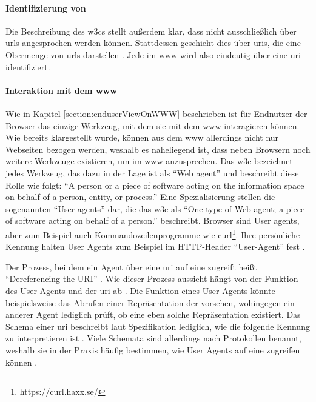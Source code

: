             \paragraph*{Identifizierung von \resources}
            Die Beschreibung des \glspl{w3c} stellt außerdem klar,
            dass \resources nicht ausschließlich über \glspl{url} angesprochen werden können.
            Stattdessen geschieht dies über \glspl{uri}, die eine Obermenge von \glspl{url} darstellen
            \cite[Kapitel 1.1.3, Seite 7]{rfc:3986}.
            Jede \resource im \gls{www} wird also eindeutig über eine \gls{uri} identifiziert.

            \paragraph*{Interaktion mit dem \gls{www}}
            Wie in Kapitel \ref{section:enduserViewOnWWW} beschrieben ist für Endnutzer
            der Browser das einzige Werkzeug, mit dem sie mit dem \gls{www}
            interagieren können. Wie bereits klargestellt wurde,
            können aus dem \gls{www} allerdings nicht nur Webseiten bezogen werden,
            weshalb es naheliegend ist, dass neben Browsern noch weitere Werkzeuge existieren,
            um \resources im \gls{www} anzusprechen.
            Das \gls{w3c} bezeichnet jedes Werkzeug, das dazu in der Lage ist als
            "`Web agent"' und beschreibt diese Rolle wie folgt:
            "`A person or a piece of software acting on the information
            space on behalf of a person, entity, or process."'
            Eine Spezialisierung stellen die sogenannten "`User agents"' dar,
            die das \gls{w3c} als "`One type of Web agent;
            a piece of software acting on behalf of a person."' beschreibt.
            Browser sind User agents, aber zum Beispiel auch Kommandozeilenprogramme
            wie curl\footnote{https://curl.haxx.se/}.
            Ihre persönliche Kennung halten User Agents zum Beispiel im
            HTTP-Header "`User-Agent"' fest \cite[Kapitel 5.5.3, Seite 46]{rfc:7231}.

            Der Prozess, bei dem ein Agent über eine \gls{uri} auf eine {\resource}
            zugreift heißt "`Dereferencing the URI"' \cite[Kapitel 3.1]{w3c:wwwArch}.
            Wie dieser Prozess aussieht hängt von der Funktion des User Agents und der \gls{uri} ab
            \cite[Kapitel 3.1]{w3c:wwwArch}.
            Die Funktion eines User Agents könnte beispielsweise das Abrufen einer
            Repräsentation der {\resource} vorsehen, wohingegen ein anderer Agent
            lediglich prüft, ob eine eben solche Repräsentation existiert.
            Das Schema einer \gls{uri} beschreibt laut Spezifikation
            lediglich, wie die folgende Kennung zu interpretieren ist
            \cite[Kapitel 3.1, Seite 17]{rfc:3986}.
            Viele Schemata sind allerdings nach Protokollen benannt,
            weshalb sie in der Praxis häufig bestimmen,
            wie User Agents auf eine {\resource} zugreifen können
            \cite[Kapitel 3.1]{w3c:wwwArch}.
            
